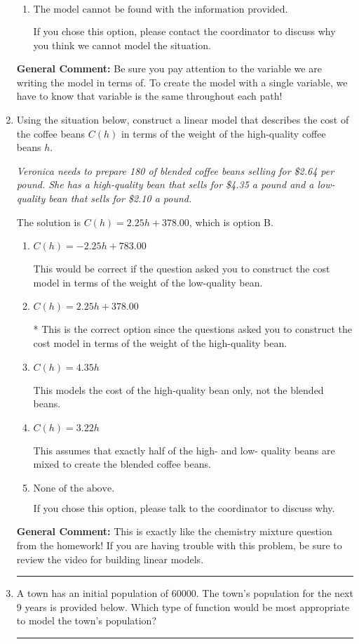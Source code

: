 \documentclass{extbook}[14pt]
\newcommand{\litem}[1]{\item #1

\rule{\textwidth}{0.4pt}}
\begin{document}
\begin{enumerate}
{\begin{enumerate}[label=\Alph*.]
Since the time spent on each path was equal, we can treat all time variables as the same variable, $t$.
\item \( \text{The model cannot be found with the information provided.} \)

If you chose this option, please contact the coordinator to discuss why you think we cannot model the situation.
\end{enumerate}

\textbf{General Comment:} Be sure you pay attention to the variable we are writing the model in terms of. To create the model with a single variable, we have to know that variable is the same throughout each path!
}
\litem{
Using the situation below, construct a linear model that describes the cost of the coffee beans $C(h)$ in terms of the weight of the high-quality coffee beans $h$.

\begin{center}
    \textit{ Veronica needs to prepare 180 of blended coffee beans selling for \$2.64 per pound. She has a high-quality bean that sells for \$4.35 a pound and a low-quality bean that sells for \$2.10 a pound. }
\end{center}
The solution is \( C(h) = 2.25 h + 378.00 \), which is option B.\begin{enumerate}[label=\Alph*.]
\item \( C(h) = -2.25 h + 783.00 \)

This would be correct if the question asked you to construct the cost model in terms of the weight of the low-quality bean.
\item \( C(h) = 2.25 h + 378.00 \)

* This is the correct option since the questions asked you to construct the cost model in terms of the weight of the high-quality bean.
\item \( C(h) = 4.35 h \)

This models the cost of the high-quality bean only, not the blended beans.
\item \( C(h) = 3.22 h \)

This assumes that exactly half of the high- and low- quality beans are mixed to create the blended coffee beans.
\item \( \text{None of the above.} \)

If you chose this option, please talk to the coordinator to discuss why.
\end{enumerate}

\textbf{General Comment:} This is exactly like the chemistry mixture question from the homework! If you are having trouble with this problem, be sure to review the video for building linear models.
}
\litem{
A town has an initial population of 60000. The town's population for the next 9 years is provided below. Which type of function would be most appropriate to model the town's population?


}
\end{enumerate}
\end{document}
